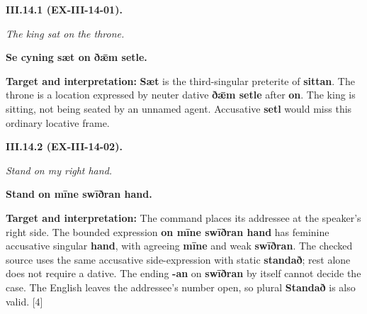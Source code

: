 \par\begin{minipage}{\linewidth}\raggedright
\textbf{III.14.1 (EX-III-14-01).}

\emph{The king sat on the throne.}

\textbf{Se cyning sæt on ðǣm setle.}

\textbf{Target and interpretation:} \textbf{Sæt} is the third-singular preterite of \textbf{sittan}. The throne is a location expressed by neuter dative \textbf{ðǣm setle} after \textbf{on}. The king is sitting, not being seated by an unnamed agent. Accusative \textbf{setl} would miss this ordinary locative frame.

\end{minipage}\par\addvspace{4pt}

\par\begin{minipage}{\linewidth}\raggedright
\textbf{III.14.2 (EX-III-14-02).}

\emph{Stand on my right hand.}

\textbf{Stand on mīne swīðran hand.}

\textbf{Target and interpretation:} The command places its addressee at the speaker's right side. The bounded expression \textbf{on mīne swīðran hand} has feminine accusative singular \textbf{hand}, with agreeing \textbf{mīne} and weak \textbf{swīðran}. The checked source uses the same accusative side-expression with static \textbf{standað}; rest alone does not require a dative. The ending \textbf{-an} on \textbf{swīðran} by itself cannot decide the case. The English leaves the addressee's number open, so plural \textbf{Standað} is also valid. [4]

\end{minipage}\par\addvspace{4pt}

